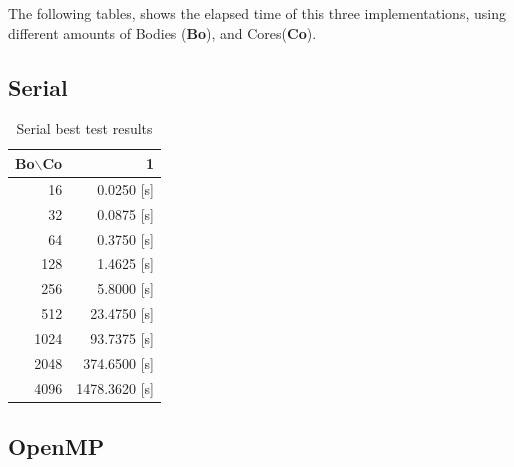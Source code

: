 The following tables,
shows the elapsed time of this three implementations,
using different amounts of Bodies (\textbf{Bo}),
and Cores(\textbf{Co}).

\subsection{Serial}

    \begin{table}[h!]
        \centering
        \small
        \begin{tabular}{|r|r|}
            \hline
            Bo$\backslash$Co & 1 \\\hline
            16   &    0.0250 [s]  \\\hline
            32   &    0.0875 [s]  \\\hline
            64   &    0.3750 [s]  \\\hline
            128  &    1.4625 [s]  \\\hline
            256  &    5.8000 [s]  \\\hline
            512  &   23.4750 [s]  \\\hline
            1024 &   93.7375 [s]  \\\hline
            2048 &  374.6500 [s]  \\\hline
            4096 & 1478.3620 [s]  \\\hline
        \end{tabular}
        \caption{Serial best test results}
        \label{tab:serial}
    \end{table}

\subsection{OpenMP}


